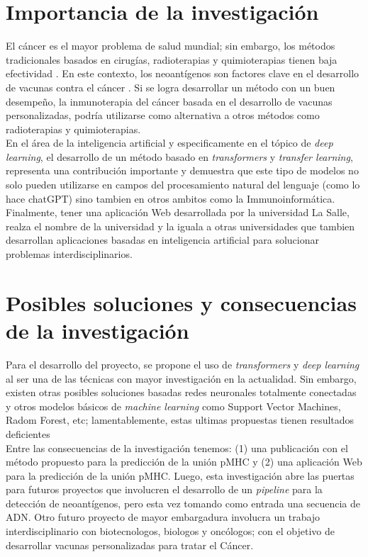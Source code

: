 \documentclass[a4paper]{article}
\begin{document}
	
\section{Importancia de la investigación}

El cáncer es el mayor problema de salud mundial; sin embargo, los métodos tradicionales basados en cirugías, radioterapias y quimioterapias tienen baja efectividad \citep{peng2019neoantigen}. En este contexto, los neoantígenos son factores clave en el desarrollo de vacunas contra el cáncer  \citep{borden2022cancer,chen2021challenges,gopanenko2020main}. Si se logra desarrollar un método con un buen desempeño, la inmunoterapia del cáncer basada en el desarrollo de vacunas personalizadas, podría utilizarse como alternativa a otros métodos como radioterapias y quimioterapias. \\

En el área de la inteligencia artificial y especificamente en el tópico de \textit{deep learning}, el desarrollo de un método basado en \textit{transformers} y \textit{transfer learning}, representa una contribución importante  y demuestra que este tipo de modelos no solo pueden utilizarse en campos del procesamiento natural del lenguaje (como lo hace chatGPT) sino tambien en otros ambitos como la Immunoinformática.\\

Finalmente, tener una aplicación Web desarrollada por la universidad La Salle, realza el nombre de la universidad y la iguala a otras universidades que tambien desarrollan aplicaciones basadas en inteligencia artificial para solucionar  problemas interdisciplinarios.

\section{Posibles soluciones y consecuencias de la investigación}

Para el desarrollo del proyecto, se propone el uso de \textit{transformers} y \textit{deep learning} al ser una de las técnicas con mayor investigación en la actualidad. Sin embargo, existen otras posibles soluciones basadas redes neuronales totalmente conectadas y otros modelos básicos de \textit{machine learning}  como Support Vector Machines, Radom Forest, etc; lamentablemente, estas ultimas propuestas tienen resultados deficientes \\

Entre las consecuencias de la investigación tenemos: (1) una publicación con el método propuesto para la predicción de la unión pMHC y (2) una aplicación Web para la predicción de la unión pMHC. Luego, esta investigación abre las puertas para futuros proyectos que involucren el desarrollo de un \textit{pipeline} para la detección de neoantígenos, pero esta vez tomando como entrada una secuencia de ADN. Otro futuro proyecto de mayor embargadura involucra un trabajo interdisciplinario con biotecnologos, biologos y oncólogos; con el objetivo de desarrollar vacunas personalizadas para tratar el Cáncer. 
\end{document}
